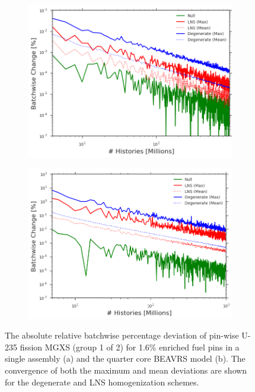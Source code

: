 \clearpage

\begin{figure}[h!]
\centering
\begin{subfigure}{.87\textwidth}
  \centering
  \includegraphics[width=\linewidth]{figures/patterns/convergence/assm-16/assm-16-dev-capture-1}
  \caption{}
  \label{fig:chap9-assm-16-dev-capt-1}
\end{subfigure}
\begin{subfigure}{.87\textwidth}
  \centering
  \includegraphics[width=\linewidth]{figures/patterns/convergence/full-core/16-enr-capt}
  \caption{}
  \label{fig:chap9-full-core-dev-capt-1}
\end{subfigure}
\caption[Convergence of U-238 capture MGXS batchwise deviation]{The absolute relative batchwise percentage deviation of pin-wise U-235 fission \ac{MGXS} (group 1 of 2) for 1.6\% enriched fuel pins in a single assembly (a) and the quarter core \ac{BEAVRS} model (b). The convergence of both the maximum and mean deviations are shown for the degenerate and \ac{LNS} homogenization schemes.}
\label{fig:chap9-capt-1-dev}
\end{figure}

